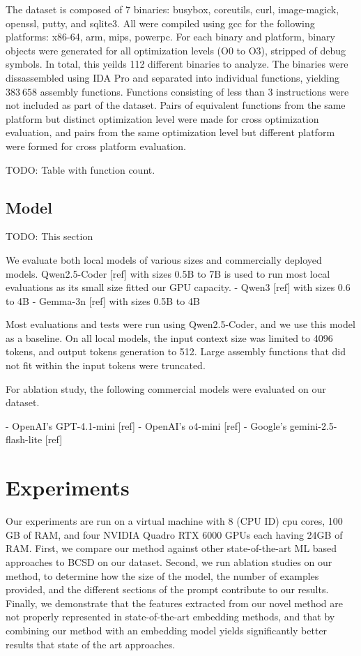 \documentclass[conference,compsoc]{IEEEtran}
\begin{document}
The dataset is composed of 7 binaries: busybox, coreutils, curl, image-magick, openssl, putty, and sqlite3.
All were compiled using gcc for the following platforms: x86-64, arm, mips, powerpc.
For each binary and platform, binary objects were generated for all optimization levels (O0 to O3),
stripped of debug symbols. In total, this yeilds 112 different binaries to analyze.
The binaries were dissassembled using IDA Pro and separated into individual functions, yielding \(383\ 658\) assembly functions.
Functions consisting of less than 3 instructions were not included as part of the dataset.
Pairs of equivalent functions from the same platform but distinct optimization level were made for cross optimization
evaluation, and pairs from the same optimization level but different platform were formed for cross
platform evaluation.

TODO: Table with function count.

\subsection{Model}

TODO: This section

We evaluate both local models of various sizes and commercially deployed models. Qwen2.5-Coder [ref] with sizes 0.5B to 7B
is used to run most local evaluations as its small size fitted our GPU capacity.
- Qwen3 [ref] with sizes 0.6 to 4B
- Gemma-3n [ref] with sizes 0.5B to 4B

Most evaluations and tests were run using Qwen2.5-Coder, and we use this model as a baseline.
On all local models, the input context size was limited to 4096 tokens, and output tokens generation to 512.
Large assembly functions that did not fit within the input tokens were truncated.

For ablation study, the following commercial models were evaluated on our dataset.

- OpenAI's GPT-4.1-mini [ref]
- OpenAI's o4-mini [ref]
- Google's gemini-2.5-flash-lite [ref]

\section{Experiments}

Our experiments are run on a virtual machine with 8 (CPU ID) cpu cores, 100 GB of RAM, and four NVIDIA Quadro RTX
6000 GPUs each having  24GB of RAM. First, we compare our method against other state-of-the-art ML based
approaches to BCSD on our dataset. Second, we run ablation studies on our method, to determine how the size
of the model, the number of examples provided, and the different sections of the prompt contribute to our results.
Finally, we demonstrate that the features extracted from our novel method are not properly represented
in state-of-the-art embedding methods, and that by combining our method with an embedding model yields significantly
better results that state of the art approaches.
\end{document}
